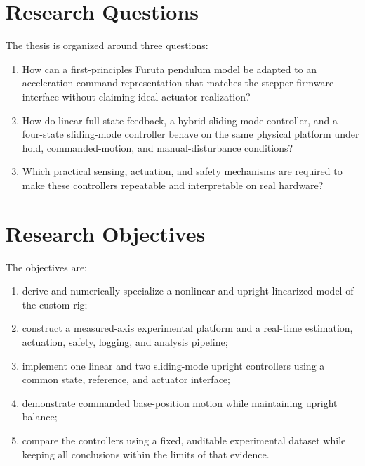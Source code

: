 \section{Research Questions}
The thesis is organized around three questions:
\begin{enumerate}
  \item How can a first-principles Furuta pendulum model be adapted to an
  acceleration-command representation that matches the stepper firmware
  interface without claiming ideal actuator realization?
  \item How do linear full-state feedback, a hybrid sliding-mode controller,
  and a four-state sliding-mode controller behave on the same physical
  platform under hold, commanded-motion, and manual-disturbance conditions?
  \item Which practical sensing, actuation, and safety mechanisms are required
  to make these controllers repeatable and interpretable on real hardware?
\end{enumerate}

\section{Research Objectives}
The objectives are:
\begin{enumerate}
  \item derive and numerically specialize a nonlinear and upright-linearized
  model of the custom rig;
  \item construct a measured-axis experimental platform and a real-time
  estimation, actuation, safety, logging, and analysis pipeline;
  \item implement one linear and two sliding-mode upright controllers using a
  common state, reference, and actuator interface;
  \item demonstrate commanded base-position motion while maintaining upright
  balance;
  \item compare the controllers using a fixed, auditable experimental dataset
  while keeping all conclusions within the limits of that evidence.
\end{enumerate}

